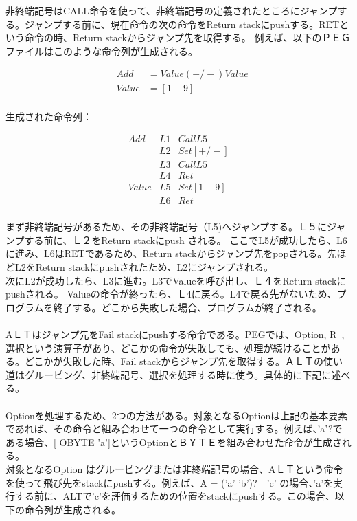 \documentclass[12pt,oneside]{report}
\begin{document}
非終端記号はCALL命令を使って、非終端記号の定義されたところにジャンプする。ジャンプする前に、現在命令の次の命令をReturn stackにpushする。RETという命令の時、Return stackからジャンプ先を取得する。
例えば、以下のＰＥＧファイルはこのような命令列が生成される。

\begin{eqnarray}\nonumber
&Add& = Value (+/-) Value\\\nonumber
&Value& = [1-9]\\\nonumber
\end{eqnarray}

生成された命令列：

\begin{eqnarray}\nonumber
Add &L1& Call L5\\\nonumber
      &L2& Set [+/-]\\\nonumber
      &L3& Call L5\\\nonumber
      &L4& Ret\\\nonumber
Value& L5 &Set[1-9]\\\nonumber
        &L6& Ret\\\nonumber
        \end{eqnarray}

まず非終端記号があるため、その非終端記号（L5)へジャンプする。Ｌ５にジャンプする前に、Ｌ２をReturn stackにpush される。
ここでL5が成功したら、L6に進み、L6はRETであるため、Return stackからジャンプ先をpopされる。先ほどL2をReturn stackにpushされたため、L2にジャンプされる。\\
次にL2が成功したら、L3に進む。L3でValueを呼び出し、Ｌ４をReturn stackにpushされる。
Valueの命令が終ったら、Ｌ4に戻る。L4で戻る先がないため、プログラムを終了する。どこから失敗した場合、プログラムが終了される。\\
\\
AＬＴはジャンプ先をFail stackにpushする命令である。PEGでは、Option, R~, 選択という演算子があり、どこかの命令が失敗しても、処理が続けることがある。どこかが失敗した時、Fail stackからジャンプ先を取得する。ＡＬＴの使い道はグルーピング、非終端記号、選択を処理する時に使う。具体的に下記に述べる。\\
\\
Optionを処理するため、2つの方法がある。対象となるOptionは上記の基本要素であれば、その命令と組み合わせて一つの命令として実行する。例えば、'a'?である場合、[ OBYTE 'a']というOptionとＢＹＴＥを組み合わせた命令が生成される。\\
対象となるOption はグルーピングまたは非終端記号の場合、AＬＴという命令を使って飛び先をstackにpushする。例えば、A = ('a' 'b')?　'c' の場合、'a'を実行する前に、ALTで'c’を評価するための位置をstackにpushする。この場合、以下の命令列が生成される。
\end{document}
